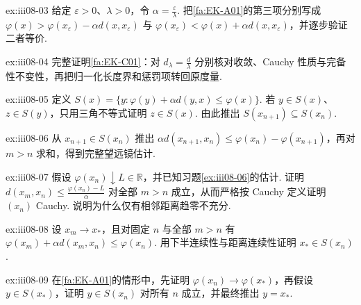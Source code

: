 \begin{FAExercise}[惩罚斜率]{ex:iii08-03}
给定 \(\displaystyle\varepsilon>0\)、\(\displaystyle\lambda>0\)，令 \(\displaystyle\alpha=\frac{\varepsilon}{\lambda}\). 把\autoref{fa:EK-A01}的第三项分别写成 \(\displaystyle\varphi(x)>\varphi(x_\varepsilon)-\alpha d(x,x_\varepsilon)\) 与 \(\displaystyle\varphi(x_\varepsilon)<\varphi(x)+\alpha d(x,x_\varepsilon)\)，并逐步验证二者等价.
\end{FAExercise}

\begin{FAExercise}[度量重标]{ex:iii08-04}
完整证明\autoref{fa:EK-C01}：对 \(\displaystyle d_\lambda=\frac{d}{\lambda}\) 分别核对收敛、Cauchy 性质与完备性不变性，再把归一化长度界和惩罚项转回原度量.
\end{FAExercise}

\begin{FAExercise}[下降集嵌套性]{ex:iii08-05}
定义 \(\displaystyle S(x)=\{y:\varphi(y)+\alpha d(y,x)\leqslant\varphi(x)\}\). 若 \(\displaystyle y\in S(x)\)、\(\displaystyle z\in S(y)\)，只用三角不等式证明 \(\displaystyle z\in S(x)\). 由此推出 \(\displaystyle S(x_{n+1})\subseteq S(x_n)\).
\end{FAExercise}

\begin{FAExercise}[望远镜距离估计]{ex:iii08-06}
从 \(\displaystyle x_{n+1}\in S(x_n)\) 推出 \(\displaystyle\alpha d(x_{n+1},x_n)\leqslant\varphi(x_n)-\varphi(x_{n+1})\)，再对 \(\displaystyle m>n\) 求和，得到完整望远镜估计.
\end{FAExercise}

\begin{FAExercise}[Cauchy 证明]{ex:iii08-07}
假设 \(\displaystyle\varphi(x_n)\downarrow L\in\mathbb R\)，并已知习题\ref{ex:iii08-06}的估计. 证明 \(\displaystyle d(x_m,x_n)\leqslant\frac{\varphi(x_n)-L}{\alpha}\) 对全部 \(\displaystyle m>n\) 成立，从而严格按 Cauchy 定义证明 \(\displaystyle(x_n)\) Cauchy. 说明为什么仅有相邻距离趋零不充分.
\end{FAExercise}

\begin{FAExercise}[下半连续极限传递]{ex:iii08-08}
设 \(\displaystyle x_m\to x_*\)，且对固定 \(\displaystyle n\) 与全部 \(\displaystyle m>n\) 有 \(\displaystyle\varphi(x_m)+\alpha d(x_m,x_n)\leqslant\varphi(x_n)\). 用下半连续性与距离连续性证明 \(\displaystyle x_*\in S(x_n)\).
\end{FAExercise}

\begin{FAExercise}[终止单点下降集]{ex:iii08-09}
在\autoref{fa:EK-A01}的情形中，先证明 \(\displaystyle\varphi(x_n)\to\varphi(x_*)\)，再假设 \(\displaystyle y\in S(x_*)\)，证明 \(\displaystyle y\in S(x_n)\) 对所有 \(\displaystyle n\) 成立，并最终推出 \(\displaystyle y=x_*\).
\end{FAExercise}

